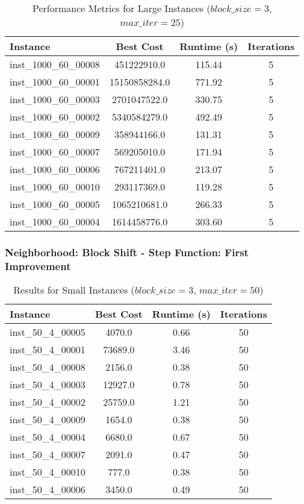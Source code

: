 \documentclass{article}
\begin{document}
\begin{table}[H]
\centering
\caption{Performance Metrics for Large Instances ($block\_size=3$, $max\_iter=25$)}
\begin{tabular}{lccc}
\toprule
\textbf{Instance} & \textbf{Best Cost} & \textbf{Runtime (s)} & \textbf{Iterations} \\
\midrule
inst\_1000\_60\_00008 & 451222910.0  & 115.44 & 5 \\
inst\_1000\_60\_00001 & 15150858284.0  & 771.92 & 5 \\
inst\_1000\_60\_00003 & 2701047522.0  & 330.75 & 5 \\
inst\_1000\_60\_00002 & 5340584279.0  & 492.49 & 5 \\
inst\_1000\_60\_00009 & 358944166.0  & 131.31 & 5 \\
inst\_1000\_60\_00007 & 569205010.0  & 171.94 & 5 \\
inst\_1000\_60\_00006 & 767211401.0  & 213.07 & 5 \\
inst\_1000\_60\_00010 & 293117369.0  & 119.28 & 5 \\
inst\_1000\_60\_00005 & 1065210681.0  & 266.33 & 5 \\
inst\_1000\_60\_00004 & 1614458776.0  & 303.60 & 5 \\
\bottomrule
\end{tabular}
\label{tab:performance_metrics_1000_60}
\end{table}

\subsubsection*{Neighborhood: Block Shift - Step Function: First Improvement}

\begin{table}[H]
\centering
\caption{Results for Small Instances ($block\_size=3$, $max\_iter=50$)}
\begin{tabular}{lccc}
\toprule
\textbf{Instance} & \textbf{Best Cost} & \textbf{Runtime (s)} & \textbf{Iterations} \\
\midrule
inst\_50\_4\_00005 & 4070.0  & 0.66 & 50 \\
inst\_50\_4\_00001 & 73689.0 & 3.46 & 50 \\
inst\_50\_4\_00008 & 2156.0  & 0.38 & 50 \\
inst\_50\_4\_00003 & 12927.0 & 0.78 & 50 \\
inst\_50\_4\_00002 & 25759.0 & 1.21 & 50 \\
inst\_50\_4\_00009 & 1654.0  & 0.38 & 50 \\
inst\_50\_4\_00004 & 6680.0  & 0.67 & 50 \\
inst\_50\_4\_00007 & 2091.0  & 0.47 & 50 \\
inst\_50\_4\_00010 & 777.0   & 0.38 & 50 \\
inst\_50\_4\_00006 & 3450.0  & 0.49 & 50 \\
\bottomrule
\end{tabular}
\label{tab:results_50_4}
\end{table}
\end{document}
